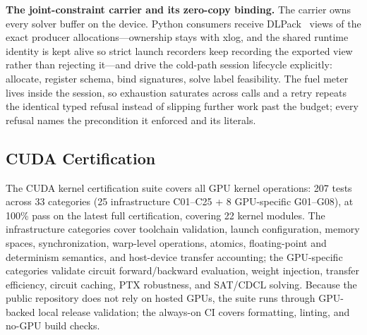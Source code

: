 \textbf{The joint-constraint carrier and its zero-copy binding.} The carrier owns every solver buffer on the device. Python consumers receive DLPack~\cite{dlpack} views of the exact producer allocations---ownership stays with xlog, and the shared runtime identity is kept alive so strict launch recorders keep recording the exported view rather than rejecting it---and drive the cold-path session lifecycle explicitly: allocate, register schema, bind signatures, solve label feasibility. The fuel meter lives inside the session, so exhaustion saturates across calls and a retry repeats the identical typed refusal instead of slipping further work past the budget; every refusal names the precondition it enforced and its literals.

\subsection{CUDA Certification}

The CUDA kernel certification suite covers all GPU kernel operations: 207 tests across 33 categories (25 infrastructure C01--C25 + 8 GPU-specific G01--G08), at 100\% pass on the latest full certification, covering 22 kernel modules. The infrastructure categories cover toolchain validation, launch configuration, memory spaces, synchronization, warp-level operations, atomics, floating-point and determinism semantics, and host-device transfer accounting; the GPU-specific categories validate circuit forward/backward evaluation, weight injection, transfer efficiency, circuit caching, PTX robustness, and SAT/CDCL solving. Because the public repository does not rely on hosted GPUs, the suite runs through GPU-backed local release validation; the always-on CI covers formatting, linting, and no-GPU build checks.

